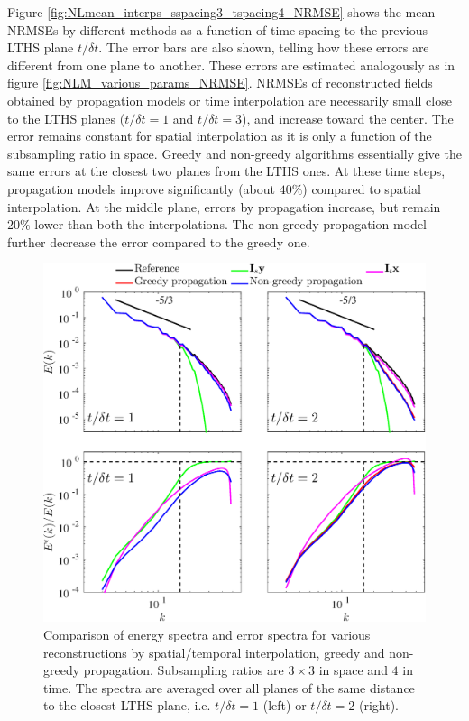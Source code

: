 Figure \ref{fig:NLmean_interps_sspacing3_tspacing4_NRMSE} shows the mean NRMSEs by different methods as a function of time spacing to the previous LTHS plane $ t/\delta t $. The error bars are also shown, telling how these errors are different from one plane to another. These errors are estimated analogously as in figure \ref{fig:NLM_various_params_NRMSE}. NRMSEs of reconstructed fields obtained by propagation models or time interpolation are necessarily small close to the LTHS planes ($ t /\delta t = 1 $ and $ t /\delta t = 3 $), and increase toward the center. The error remains constant for spatial interpolation as it is only a function of the subsampling ratio in space. Greedy and non-greedy algorithms essentially give the same errors at the closest two planes from the LTHS ones. At these time steps, propagation models improve significantly (about $ 40 \% $) compared to spatial interpolation. At the middle plane, errors by propagation increase, but remain $ 20\% $ lower than both the interpolations. The non-greedy propagation model further decrease the error compared to the greedy one. 

\begin{figure}[t]
	\centering
	\includegraphics[width=\columnwidth]{./images/NLM/interpdiff/NLmean_interps_sspacing3_tspacing4_spectra2d.eps}		
	\caption{\label{fig:NLmean_interps_sspacing3_tspacing4_spectra2d} Comparison of energy spectra and error spectra for various reconstructions by spatial/temporal interpolation, greedy and non-greedy propagation. Subsampling ratios are $ 3 \times 3 $ in space and $ 4 $ in time. The spectra are averaged over all planes of the same distance to the closest LTHS plane, i.e. $ t/\delta t= 1 $ (left) or $t/\delta t= 2  $ (right).}
\end{figure}

